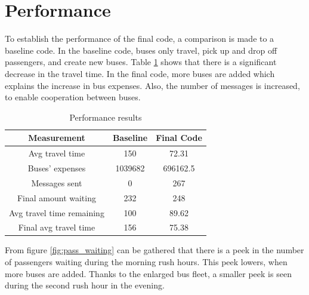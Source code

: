 \section{Performance}

To establish the performance of the final code, a comparison is made to a baseline code. In the baseline code, buses only travel, pick up and drop off passengers, and create new buses. Table \ref{table:table1} shows that there is a significant decrease in the travel time. In the final code, more buses are added which explains the increase in bus expenses. Also, the number of messages is increased, to enable cooperation between buses. 

\begin{table}[htbp]
\centering
\begin{tabular}{ |c|c|c|  }
 \hline
  Measurement & Baseline & Final Code \\
 \hline
  Avg travel time & 150 & 72.31 \\
  Buses' expenses & 1039682 & 696162.5 \\
  Messages sent & 0 & 267  \\
  Final amount waiting & 232 & 248 \\
  Avg travel time remaining & 100 & 89.62 \\
  Final avg travel time & 156 & 75.38 \\
 \hline
\end{tabular}
\label{table:table1}
\caption{Performance results}
\end{table}

From figure \ref{fig:pass_waiting} can be gathered that there is a peek in the number of passengers waiting during the morning rush hours. This peek lowers, when more buses are added. Thanks to the enlarged bus fleet, a smaller peek is seen during the second rush hour in the evening.

